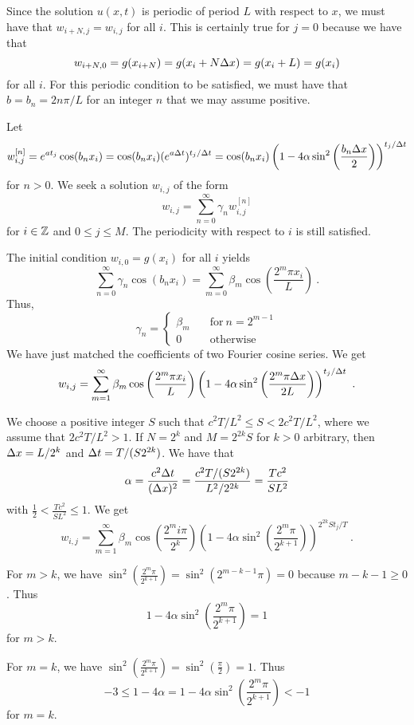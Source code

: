 \begin{egg}
Since the solution $u(x,t)$ is periodic of period $L$ with respect to $x$, we
must have that $w_{i+N,j} = w_{i,j}$ for all $i$.  This is certainly
true for $j=0$ because we have that
\[
  w_{i+N,0} = g(x_{i+N}) = g(x_i + N\Delta{x}) = g(x_i+L) = g(x_i)
\]
for all $i$.  For this periodic condition to be satisfied, we must
have that $\displaystyle b = b_n = 2n\pi/L$ for an integer $n$ that we
may assume positive.

Let
\[
w_{i,j}^{[n]} = e^{at_j}\cos(b_n x_i)
= \cos(b_n x_i) (e^{a\Delta{t}})^{t_j/\Delta{t}} = \cos(b_n x_i)
\left(1 - 4\alpha \sin^2\left(\frac{b_n\Delta{x}}{2}\right)\right)^{t_j/\Delta{t}}
\]
for $n>0$.  We seek a solution $w_{i,j}$ of the form
\[
w_{i,j} = \sum_{n=0}^\infty \gamma_n w_{i,j}^{[n]}
\]
for $i \in \mathbb{Z}$ and $0 \leq j \leq M$.  The periodicity with respect
to $i$ is still satisfied.

The initial condition $w_{i,0} = g(x_i)$ for all $i$ yields
\[
\sum_{n=0}^\infty \gamma_n \cos(b_n x_i) =
\sum_{m=0}^\infty \beta_m \cos\left(\frac{2^m \pi x_i}{L}\right) \ .
\]
Thus,
\[
\gamma_n = \begin{cases} \beta_m & \quad \text{for} \ n = 2^{m-1} \\
0 & \quad \text{otherwise}
\end{cases}
\]
We have just matched the coefficients of two Fourier cosine series.
We get
\[
w_{i,j} = \sum_{m=1}^\infty \beta_m
\cos\left(\frac{2^m\pi x_i}{L}\right)
\left(1  - 4\alpha \sin^2\left(\frac{2^m \pi \Delta{x}}{2L}\right)
\right)^{t_j/\Delta{t}} \ .
\]

We choose a positive integer $S$ such that
$\displaystyle c^2T/L^2\leq S < 2c^2T/L^2$, where we
assume that $\displaystyle 2c^2 T/ L^2 > 1$.
If $N = 2^k$ and $M= 2^{2k}S$ for $k>0$ arbitrary, then
$\Delta{x} = L/2^k$ and $\Delta{t} = T/(S2^{2k})$.
We have that
\[
\alpha = \frac{c^2\Delta{t}}{(\Delta{x})^2}
= \frac{ c^2 T /(S2^{2k})}{L^2/2^{2k}}
= \frac{T c^2}{S L^2} 
\]
with
$\displaystyle \frac{1}{2} <  \frac{T c^2}{SL^2} \leq 1$.
We get
\[
w_{i,j} = \sum_{m=1}^\infty \beta_m
\cos\left( \frac{ 2^m i \pi}{2^k}\right)
\left(1 - 4\alpha \sin^2\left( \frac{2^m\pi}{2^{k+1}} \right)
\right)^{2^{2k} S t_j/T} \ .
\]

For $m > k$, we have
$\displaystyle \sin^2\left( \frac{2^m\pi}{2^{k+1}} \right)
= \sin^2\left( 2^{m-k-1}\pi\right) = 0$
because $m - k -1 \geq 0$.  Thus
\[
  1 - 4\alpha \sin^2\left( \frac{2^m\pi}{2^{k+1}}\right) =1
\]
for $m > k$.

For $m = k$, we have
$\displaystyle  \sin^2\left( \frac{2^m\pi}{2^{k+1}} \right)
= \sin^2\left( \frac{\pi}{2}\right) = 1$.  Thus
\[
-3 \leq  1 - 4 \alpha = 1 - 4\alpha \sin^2\left(
    \frac{2^m\pi}{2^{k+1}}\right) < -1
\]
for $m = k$.


\end{egg}
